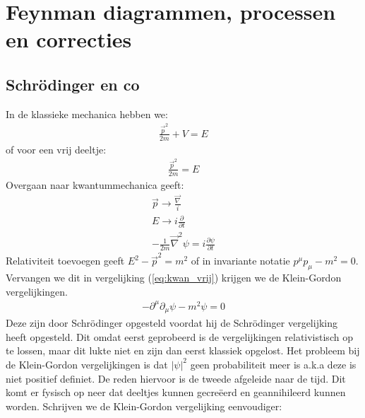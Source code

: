 \documentclass[../main.tex]{subfiles}
\begin{document}
\section{Feynman diagrammen, processen en correcties}%
\label{sec:feynman_diagrammen_processen_en_correcties}

\subsection{Schrödinger en co}%
\label{sub:schrodinger_en_co}

In de klassieke mechanica hebben we:
\begin{equation}
    \begin{aligned}
        \label{eq:klas_mech}
        \frac{\vec{p}^2}{2m} +V=E
    \end{aligned}
\end{equation}
of voor een vrij deeltje:
\begin{equation}
    \begin{aligned}
        \label{eq:klas_vrij}
        \frac{\vec{p}^2}{2m}=E
    \end{aligned}
\end{equation}
Overgaan naar kwantummechanica geeft:
\begin{equation}
    \begin{aligned}
        \label{eq:kwan_vrij}
        \vec{p}\rightarrow \frac{\vec{\nabla}}{i} \\
        E \rightarrow i \frac{\partial}{\partial t} \\
        - \frac{1}{2m} \vec{\nabla}^2\psi = i \frac{\partial \psi}{\partial t} 
    \end{aligned}
\end{equation}
Relativiteit toevoegen geeft $E^2-\vec{p}^2=m^2$ of in invariante notatie $p^\mu p_\mu-m^2=0$. Vervangen we dit in vergelijking (\ref{eq:kwan_vrij}) krijgen we de Klein-Gordon vergelijkingen.
\begin{equation}
    \begin{aligned}
        \label{eq:klein_gordon}
        -\partial^\mu\partial_\mu \psi - m^2\psi = 0
    \end{aligned}
\end{equation}
Deze zijn door Schrödinger opgesteld voordat hij de Schrödinger vergelijking heeft opgesteld. Dit omdat eerst geprobeerd is de vergelijkingen relativistisch op te lossen, maar dit lukte niet en zijn dan eerst klassiek opgelost. Het probleem bij de Klein-Gordon vergelijkingen is dat $|\psi|^2$ geen probabiliteit meer is a.k.a deze is niet positief definiet. De reden hiervoor is de tweede afgeleide naar de tijd. Dit komt er fysisch op neer dat deeltjes kunnen gecreëerd en geannihileerd kunnen worden. Schrijven we de Klein-Gordon vergelijking eenvoudiger:
\end{document}
